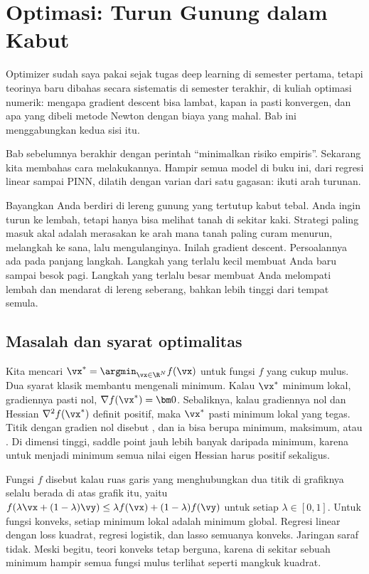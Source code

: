 \chapter{Optimasi: Turun Gunung dalam Kabut}
\label{ch:optimasi}

Optimizer sudah saya pakai sejak tugas deep learning di semester pertama, tetapi teorinya baru
dibahas secara sistematis di semester terakhir, di kuliah optimasi numerik: mengapa gradient
descent bisa lambat, kapan ia pasti konvergen, dan apa yang dibeli metode Newton dengan biaya
yang mahal. Bab ini menggabungkan kedua sisi itu.

Bab sebelumnya berakhir dengan perintah ``minimalkan risiko empiris''. Sekarang kita membahas
cara melakukannya. Hampir semua model di buku ini, dari regresi linear sampai PINN, dilatih
dengan varian dari satu gagasan: ikuti arah turunan.

Bayangkan Anda berdiri di lereng gunung yang tertutup kabut tebal. Anda ingin turun ke lembah,
tetapi hanya bisa melihat tanah di sekitar kaki. Strategi paling masuk akal adalah merasakan ke
arah mana tanah paling curam menurun, melangkah ke sana, lalu mengulanginya. Inilah gradient
descent. Persoalannya ada pada panjang langkah. Langkah yang terlalu kecil membuat Anda baru
sampai besok pagi. Langkah yang terlalu besar membuat Anda melompati lembah dan mendarat di
lereng seberang, bahkan lebih tinggi dari tempat semula.

\section{Masalah dan syarat optimalitas}

Kita mencari $\vx^*=\argmin_{\vx\in\R^N}f(\vx)$ untuk fungsi $f$ yang cukup mulus. Dua syarat
klasik membantu mengenali minimum. Kalau $\vx^*$ minimum lokal, gradiennya pasti nol,
$\nabla f(\vx^*)=\bm0$. Sebaliknya, kalau gradiennya nol dan Hessian $\nabla^2f(\vx^*)$ definit
positif, maka $\vx^*$ pasti minimum lokal yang tegas. Titik dengan gradien nol disebut
, dan ia bisa berupa minimum, maksimum, atau . Di
dimensi tinggi, saddle point jauh lebih banyak daripada minimum, karena untuk menjadi minimum
semua nilai eigen Hessian harus positif sekaligus.

Fungsi $f$ disebut  kalau ruas garis yang menghubungkan dua titik di grafiknya
selalu berada di atas grafik itu, yaitu $f(\lambda\vx+(1-\lambda)\vy)\le\lambda f(\vx)+(1-\lambda)f(\vy)$
untuk setiap $\lambda\in[0,1]$. Untuk fungsi konveks, setiap minimum lokal adalah minimum global.
Regresi linear dengan loss kuadrat, regresi logistik, dan lasso semuanya konveks. Jaringan saraf
tidak. Meski begitu, teori konveks tetap berguna, karena di sekitar sebuah minimum hampir semua
fungsi mulus terlihat seperti mangkuk kuadrat.

